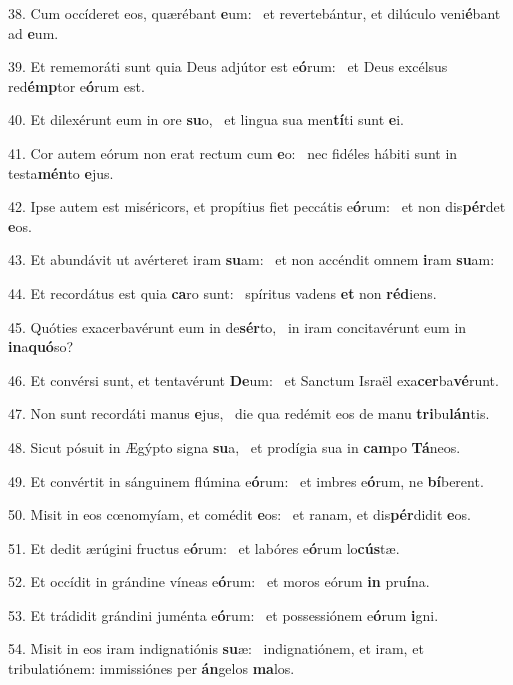 38. Cum occíderet eos, quærébant \textbf{e}um: \ast\  et revertebántur, et dilúculo veni\textbf{é}bant ad \textbf{e}um.\

39. Et rememoráti sunt quia Deus adjútor est e\textbf{ó}rum: \ast\  et Deus excélsus red\textbf{émp}tor e\textbf{ó}rum est.\

40. Et dilexérunt eum in ore \textbf{su}o, \ast\  et lingua sua men\textbf{tí}ti sunt \textbf{e}i.\

41. Cor autem eórum non erat rectum cum \textbf{e}o: \ast\  nec fidéles hábiti sunt in testa\textbf{mén}to \textbf{e}jus.\

42. Ipse autem est miséricors, et propítius fiet peccátis e\textbf{ó}rum: \ast\  et non dis\textbf{pér}det \textbf{e}os.\

43. Et abundávit ut avérteret iram \textbf{su}am: \ast\  et non accéndit omnem \textbf{i}ram \textbf{su}am:\

44. Et recordátus est quia \textbf{ca}ro sunt: \ast\  spíritus vadens \textbf{et} non \textbf{réd}iens.\

45. Quóties exacerbavérunt eum in de\textbf{sér}to, \ast\  in iram concitavérunt eum in \textbf{in}a\textbf{quó}so?\

46. Et convérsi sunt, et tentavérunt \textbf{De}um: \ast\  et Sanctum Israël exa\textbf{cer}ba\textbf{vé}runt.\

47. Non sunt recordáti manus \textbf{e}jus, \ast\  die qua redémit eos de manu \textbf{tri}bu\textbf{lán}tis.\

48. Sicut pósuit in Ægýpto signa \textbf{su}a, \ast\  et prodígia sua in \textbf{cam}po \textbf{Tá}neos.\

49. Et convértit in sánguinem flúmina e\textbf{ó}rum: \ast\  et imbres e\textbf{ó}rum, ne \textbf{bí}berent.\

50. Misit in eos cœnomyíam, et comédit \textbf{e}os: \ast\  et ranam, et dis\textbf{pér}didit \textbf{e}os.\

51. Et dedit ærúgini fructus e\textbf{ó}rum: \ast\  et labóres e\textbf{ó}rum lo\textbf{cús}tæ.\

52. Et occídit in grándine víneas e\textbf{ó}rum: \ast\  et moros eórum \textbf{in} pru\textbf{í}na.\

53. Et trádidit grándini juménta e\textbf{ó}rum: \ast\  et possessiónem e\textbf{ó}rum \textbf{i}gni.\

54. Misit in eos iram indignatiónis \textbf{su}æ: \ast\  indignatiónem, et iram, et tribulatiónem: immissiónes per \textbf{án}gelos \textbf{ma}los.\

